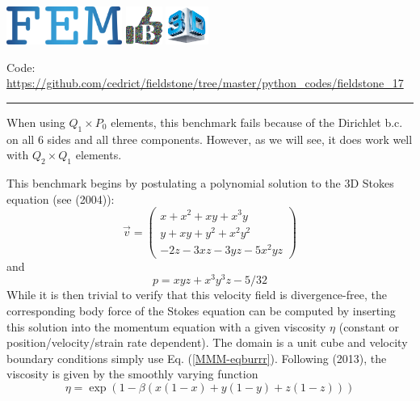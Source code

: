 \includegraphics[height=1.25cm]{images/pictograms/FEM}
\includegraphics[height=1.25cm]{images/pictograms/benchmark}
\includegraphics[height=1.25cm]{images/pictograms/3d}




\begin{center}
\inpython
{\small Code: \url{https://github.com/cedrict/fieldstone/tree/master/python_codes/fieldstone_17}}
\end{center}

\par\noindent\rule{\textwidth}{0.4pt}


When using $Q_1 \times P_0$ elements, this benchmark fails 
 because of the Dirichlet b.c. on all 6 sides and all three components.
However, as we will see, it does work well with $Q_2 \times Q_1$ elements. 

This benchmark begins by postulating a polynomial solution to the 3D Stokes 
equation (see \textcite{dobo04} (2004)):
\begin{equation}
\vec{v}
=
\left(
\begin{array}{c}
x+x^2+xy+x^3y \\
y + xy + y^2 + x^2 y^2\\
-2z - 3xz - 3yz - 5x^2 yz
\end{array}
\right)
\label{eqburrr}
\end{equation}
and
\begin{equation}
p = xyz + x^3 y^3z - 5/32
\end{equation}
While it is then trivial to verify that this velocity field is divergence-free,  
the corresponding body force of the Stokes equation can be computed by 
inserting this solution into the momentum equation with a given viscosity $\eta$
(constant or position/velocity/strain rate dependent). 
The domain is a unit cube and velocity boundary conditions 
simply use Eq. (\ref{MMM-eqburrr}). 
Following \textcite{busa13} (2013), the viscosity
is given by the smoothly varying function
\begin{equation}
\eta = \exp(1 - \beta(x(1 - x) + y(1 - y) + z(1 - z)))
\end{equation}

